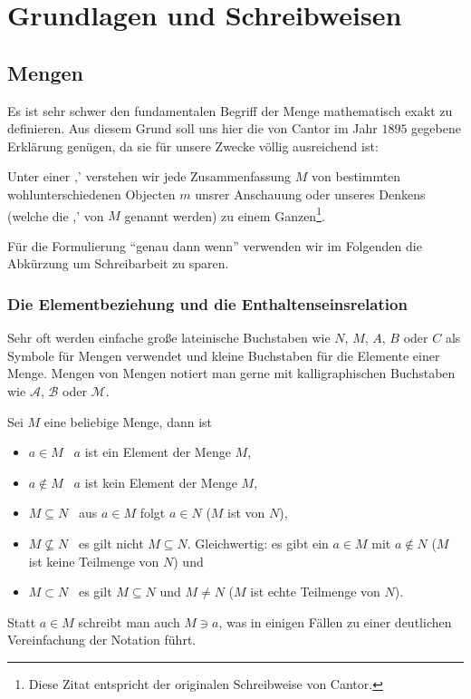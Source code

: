 \section{Grundlagen und Schreibweisen}

\subsection{Mengen}Es ist sehr schwer den fundamentalen Begriff der Menge mathematisch exakt
zu definieren. Aus diesem Grund soll uns hier die von Cantor im Jahr $1895$ gegebene
Erklärung genügen, da sie für unsere Zwecke völlig ausreichend ist:

\begin{definition}
Unter einer ,' verstehen wir jede Zusammenfassung $M$ von 
bestimmten wohlunterschiedenen Objecten $m$ unsrer Anschauung oder 
unseres Denkens (welche die ,' von $M$ genannt werden) zu 
einem Ganzen\footnote{Diese Zitat entspricht der originalen
Schreibweise von Cantor.}. 
\end{definition}

\noindent Für die Formulierung "`genau dann wenn"' verwenden wir im Folgenden
die Abkürzung \gdw{} um Schreibarbeit zu sparen.

\subsubsection{Die Elementbeziehung und die Enthaltenseinsrelation}
Sehr oft werden einfache große lateinische Buchstaben wie $N$, $M$, $A$, $B$ oder $C$ 
als Symbole für Mengen verwendet und kleine Buchstaben für die Elemente einer Menge.
Mengen von Mengen notiert man gerne mit kalligraphischen Buchstaben wie $\mathcal{A}$, 
$\mathcal{B}$ oder $\mathcal{M}$.
\begin{definition}
\label{InclSet}
Sei $M$ eine beliebige Menge, dann ist
\begin{itemize}
%
\item $a \in M$ \gdw\ $a$ ist ein Element der Menge
$M$\index{$\in$},
%
\item $a \not\in M$ \gdw\ $a$ ist kein Element der Menge $M$\index{$\not\in$},
%
\item $M \subseteq N$ \gdw\ aus $a \in M$ folgt $a \in N$ ($M$ ist
 von $N$)\index{$\subseteq$},
%
\item $M \not\subseteq N$ \gdw\ es gilt nicht $M \subseteq
N$. Gleichwertig: es gibt ein $a \in M$ mit $a \not\in N$ ($M$ ist
keine Teilmenge von $N$)\index{$\not\subseteq$} und
%
\item $M \subset N$ \gdw\ es gilt $M \subseteq N$ und $M \not= N$ ($M$ ist
echte Teilmenge von $N$)\index{$\subset$}.
%
\end{itemize}
Statt $a \in M$ schreibt man auch $M \ni a$\index{$\ni$}, was in
einigen Fällen zu einer deutlichen Vereinfachung der Notation führt.
\end{definition}

